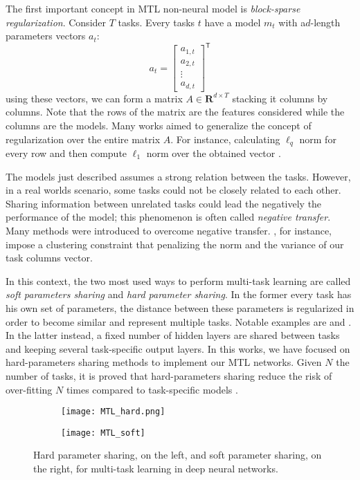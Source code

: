The first important concept in MTL non-neural model is \emph{block-sparse regularization}. Consider $T$ tasks. Every tasks $t$ have a model $m_t$ with  a$d$-length parameters vectors $a_t$: 
\begin{equation}
a_t = \begin{bmatrix}
           a_{1, t} \\
           a_{2, t} \\
           \vdots \\
           a_{d, t}
         \end{bmatrix}^\mathsf{T}
\end{equation}
using these vectors, we can form a matrix $A \in \mathbf{R}^{d \times T}$ stacking it columns by columns. Note that the rows of the matrix are the features considered while the columns are the models. Many works aimed to generalize the concept of regularization over the entire matrix $A$. For instance, calculating $\ell_q$ norm for every row and then compute $\ell_1$ norm over the obtained vector \cite{Ruder2017, Zhang2008, ArgyriouPontil2008, YuanLin2006}.  

The models just described assumes a strong relation between the tasks. However, in a real worlds scenario, some tasks could not be closely related to each other. Sharing information between unrelated tasks could lead the negatively the performance of the model; this phenomenon is often called \emph{negative transfer}. 
Many methods were introduced to overcome negative transfer. \cite{Evgeniou2005}, for instance, impose a clustering constraint that penalizing the norm and the variance of our task columns vector.

In this context, the two
most used ways to perform multi-task learning are called \emph{soft
parameters sharing} and \emph{hard parameter sharing}. In the former
every task has his own set of parameters, the distance between these
parameters is regularized in order to become similar and represent
multiple tasks. Notable examples are \cite{duong-etal-2015-low} and
\cite{yang2016trace}. In the latter instead, a fixed number of hidden
layers are shared between tasks and keeping several task-specific output
layers. In this works, we have focused on hard-parameters sharing methods
to implement our MTL networks. Given $N$ the number of tasks, it is proved
that hard-parameters sharing reduce the risk of over-fitting $N$ times
compared to task-specific models \cite{baxter1997}.
\begin{figure}
\centering
\begin{subfigure}{.5\textwidth}
  \centering
  \texttt{[image: MTL\_hard.png]}
  \label{fig:sub1}
\end{subfigure}%
\begin{subfigure}{.5\textwidth}
  \centering
  \texttt{[image: MTL\_soft]}
  \label{fig:sub2}
\end{subfigure}
\caption{Hard parameter sharing, on the left, and soft parameter sharing, on the right, for multi-task learning in deep neural networks.}
\label{fig:test}
\end{figure}

